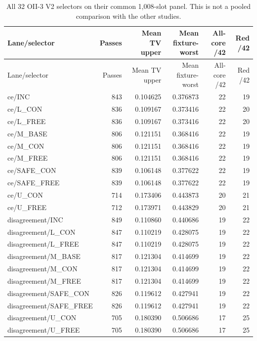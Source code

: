 \begingroup\footnotesize
\setlength{\tabcolsep}{5pt}
\begin{longtable}{lrrrrr}
\caption{All 32 OII-3 V2 selectors on their common 1,008-slot panel. This is not a pooled comparison with the other studies.}\label{tab:oii3}\\
\toprule
Lane/selector & Passes & Mean TV upper & \shortstack{Mean fixture-\\worst} & All-core /42 & Red /42 \\
\midrule
\endfirsthead
\toprule
Lane/selector & Passes & Mean TV upper & \shortstack{Mean fixture-\\worst} & All-core /42 & Red /42 \\
\midrule
\endhead
ce/INC & 843 & 0.104625 & 0.376873 & 22 & 19 \\
ce/L\_CON & 836 & 0.109167 & 0.373416 & 22 & 20 \\
ce/L\_FREE & 836 & 0.109167 & 0.373416 & 22 & 20 \\
ce/M\_BASE & 806 & 0.121151 & 0.368416 & 22 & 19 \\
ce/M\_CON & 806 & 0.121151 & 0.368416 & 22 & 19 \\
ce/M\_FREE & 806 & 0.121151 & 0.368416 & 22 & 19 \\
ce/SAFE\_CON & 839 & 0.106148 & 0.377622 & 22 & 19 \\
ce/SAFE\_FREE & 839 & 0.106148 & 0.377622 & 22 & 19 \\
ce/U\_CON & 714 & 0.173406 & 0.443873 & 20 & 21 \\
ce/U\_FREE & 712 & 0.173971 & 0.443829 & 20 & 21 \\
disagreement/INC & 849 & 0.110860 & 0.440686 & 19 & 22 \\
disagreement/L\_CON & 847 & 0.110219 & 0.428075 & 19 & 22 \\
disagreement/L\_FREE & 847 & 0.110219 & 0.428075 & 19 & 22 \\
disagreement/M\_BASE & 817 & 0.121304 & 0.414699 & 19 & 22 \\
disagreement/M\_CON & 817 & 0.121304 & 0.414699 & 19 & 22 \\
disagreement/M\_FREE & 817 & 0.121304 & 0.414699 & 19 & 22 \\
disagreement/SAFE\_CON & 826 & 0.119612 & 0.427941 & 19 & 22 \\
disagreement/SAFE\_FREE & 826 & 0.119612 & 0.427941 & 19 & 22 \\
disagreement/U\_CON & 705 & 0.180390 & 0.506686 & 17 & 25 \\
disagreement/U\_FREE & 705 & 0.180390 & 0.506686 & 17 & 25 \\

\end{longtable}
